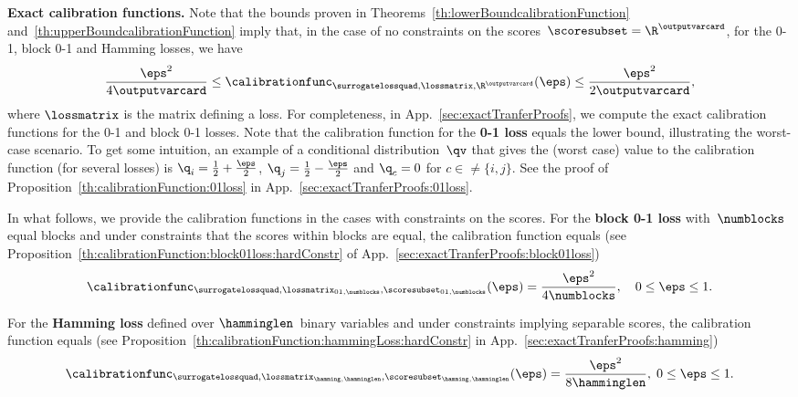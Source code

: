 \documentclass{article}
\begin{document}
%
%
\textbf{Exact calibration functions.}
%
Note that the bounds proven in Theorems~\ref{th:lowerBoundcalibrationFunction} and~\ref{th:upperBoundcalibrationFunction} imply that, in the case of no constraints on the scores~$\scoresubset = \R^\outputvarcard$, for the 0-1, block 0-1 and Hamming losses, we have
\begin{equation}
\label{eq:lowerUpperBounds}
\frac{\eps^2}{4\outputvarcard} \leq \calibrationfunc_{\surrogatelossquad,\lossmatrix,\R^\outputvarcard}(\eps) \leq \frac{\eps^2}{2\outputvarcard},
\end{equation}
where $\lossmatrix$ is the matrix defining a loss.
For completeness, in App.~\ref{sec:exactTranferProofs}, we compute the exact calibration functions for the 0-1 and block 0-1 losses.
Note that the calibration function for the \textbf{0-1 loss} equals the lower bound, illustrating the worst-case scenario. To get some intuition, an example of a conditional distribution~$\qv$ that gives the (worst case) value to the calibration function (for several losses) is $\q_i = \frac{1}{2} + \frac{\eps}{2}$, $\q_j = \frac{1}{2} - \frac{\eps}{2}$ and $\q_c=0$ for $c \in \neq \{i,j\}$. See the proof of Proposition~\ref{th:calibrationFunction:01loss} in App.~\ref{sec:exactTranferProofs:01loss}.

In what follows, we provide the calibration functions in the cases with constraints on the scores.
For the \textbf{block 0-1 loss} with~$\numblocks$ equal blocks and under constraints that the scores within blocks are equal, the calibration function equals (see Proposition~\ref{th:calibrationFunction:block01loss:hardConstr} of  App.~\ref{sec:exactTranferProofs:block01loss})
\begin{equation}
\label{eq:calibrationFunction:block01loss:hardConstr}
\calibrationfunc_{\surrogatelossquad,\lossmatrix_{01,\numblocks},\scoresubset_{01,\numblocks}}(\eps)
=
\frac{\eps^2}{4\numblocks},
\quad 0 \leq \eps \leq 1.
\end{equation}

For the \textbf{Hamming loss} defined over $\hamminglen$~binary variables and under constraints implying separable scores, the calibration function equals (see Proposition~\ref{th:calibrationFunction:hammingLoss:hardConstr} in App.~\ref{sec:exactTranferProofs:hamming})
\begin{equation}
\label{eq:calibrationFunction:hammingloss:hardConstr}
\calibrationfunc_{\surrogatelossquad,\lossmatrix_{\hamming,\hamminglen},\scoresubset_{\hamming,\hamminglen}}(\eps)
=
\frac{\eps^2}{8\hamminglen},
\; 0 \leq \eps \leq 1.
\end{equation}
\end{document}
